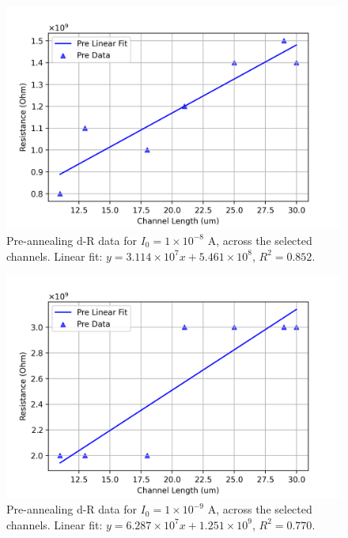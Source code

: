 \begin{figure}[H]
    \centering
    \includegraphics[width=\textwidth]{Chapter3/Figs/Raster/Sample F 2022/Pre-anneal data/1e-08A.png}
    \caption{Pre-annealing d-R data for $I_{0}=1\times10^{-8}$ \si{\ampere}, across the selected channels. Linear fit: $y = 3.114\times10^{7}x + 5.461\times10^{8}$, $R^{2}=0.852$.}
    \label{fig:pre-anneal-dr-1e-8}
\end{figure}
\begin{figure}[H]
    \centering
    \includegraphics[width=\textwidth]{Chapter3/Figs/Raster/Sample F 2022/Pre-anneal data/1e-09A.png}
    \caption{Pre-annealing d-R data for $I_{0}=1\times10^{-9}$ \si{\ampere}, across the selected channels. Linear fit: $y = 6.287\times10^{7}x + 1.251\times10^{9}$, $R^{2}=0.770$.}
    \label{fig:pre-anneal-dr-1e-9}
\end{figure}
